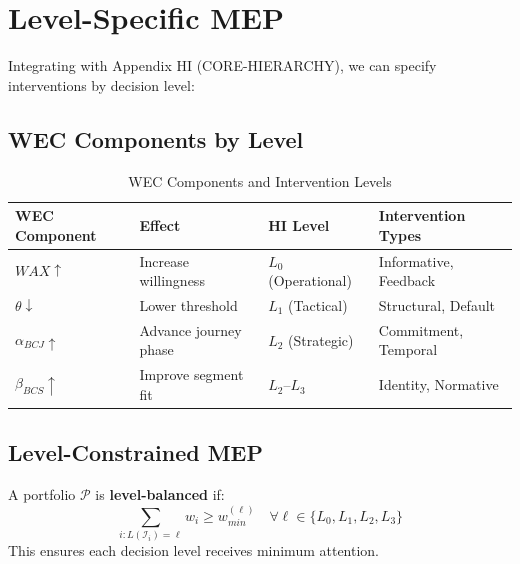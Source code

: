 \section{Level-Specific MEP}
\label{sec:mep-levels}

Integrating with Appendix HI (CORE-HIERARCHY), we can specify interventions by
decision level:

\subsection{WEC Components by Level}

\begin{table}[htbp]
\centering
\caption{WEC Components and Intervention Levels}
\label{tab:wec-levels}
\renewcommand{\arraystretch}{1.4}
\begin{tabular}{@{}llll@{}}
\toprule
\textbf{WEC Component} & \textbf{Effect} & \textbf{HI Level} & \textbf{Intervention Types} \\
\midrule
$WAX \uparrow$ & Increase willingness & $L_0$ (Operational) & Informative, Feedback \\
$\theta \downarrow$ & Lower threshold & $L_1$ (Tactical) & Structural, Default \\
$\alpha_{BCJ} \uparrow$ & Advance journey phase & $L_2$ (Strategic) & Commitment, Temporal \\
$\beta_{BCS} \uparrow$ & Improve segment fit & $L_2$--$L_3$ & Identity, Normative \\
\bottomrule
\end{tabular}
\end{table}

\subsection{Level-Constrained MEP}

\begin{definition}
\label{def:level-balanced}
A portfolio $\mathcal{P}$ is \textbf{level-balanced} if:
\begin{equation}
\sum_{i: L(\mathcal{I}_i) = \ell} w_i \geq w_{min}^{(\ell)} \quad \forall \ell \in \{L_0, L_1, L_2, L_3\}
\end{equation}
This ensures each decision level receives minimum attention.
\end{definition}

